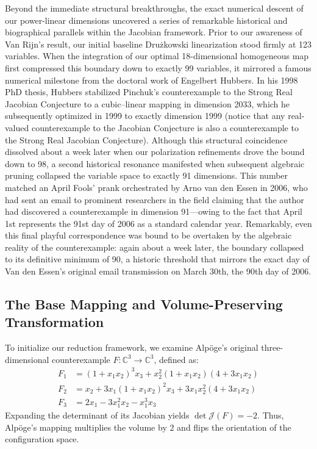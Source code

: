 \documentclass[11pt,a4paper]{article}
\begin{document}
Beyond the immediate structural breakthroughs, the exact numerical descent of our power-linear dimensions uncovered a series of remarkable historical and biographical parallels within the Jacobian framework. Prior to our awareness of Van Rijn's result, our initial baseline Dru\.{z}kowski linearization stood firmly at 123 variables. When the integration of our optimal 18-dimensional homogeneous map first compressed this boundary down to exactly 99 variables, it mirrored a famous numerical milestone from the doctoral work of Engelbert Hubbers. In his 1998 PhD thesis, Hubbers stabilized Pinchuk's  counterexample to the Strong Real Jacobian Conjecture to a cubic--linear mapping in dimension 2033, which he subsequently optimized in 1999 to exactly dimension 1999 (notice that any real-valued counterexample to the Jacobian Conjecture is also a counterexample to the Strong Real Jacobian Conjecture). Although this structural coincidence dissolved about a week later when our polarization refinements drove the bound down to 98, a second historical resonance manifested when subsequent algebraic pruning collapsed the variable space to exactly 91 dimensions. This number matched an April Fools' prank orchestrated by Arno van den Essen in 2006, who had sent an email to prominent researchers in the field claiming that the author had discovered a counterexample in dimension 91—owing to the fact that April 1st represents the 91st day of 2006 as a standard calendar year. Remarkably, even this final playful correspondence was bound to be overtaken by the algebraic reality of the counterexample: again about a week later, the boundary collapsed to its definitive minimum of 90, a historic threshold that mirrors the exact day of Van den Essen's original email transmission on March 30th, the 90th day of 2006.

\subsection{The Base Mapping and Volume-Preserving Transformation}

To initialize our reduction framework, we examine Alpöge's original three-dimensional counterexample $F: \mathbb{C}^3 \to \mathbb{C}^3$, defined as:
\begin{align}
F_1 &= (1+x_1 x_2)^3 x_3 + x_2^2(1+x_1 x_2)(4+3x_1 x_2) \\
F_2 &= x_2 + 3x_1(1+x_1 x_2)^2 x_3 + 3x_1 x_2^2(4+3x_1 x_2) \\
F_3 &= 2x_1 - 3x_1^2 x_2 - x_1^3 x_3
\end{align}
Expanding the determinant of its Jacobian yields $\det \mathcal{J}(F) = -2$. Thus, Alpöge's mapping multiplies the volume by $2$ and flips the orientation of the configuration space.
\end{document}
